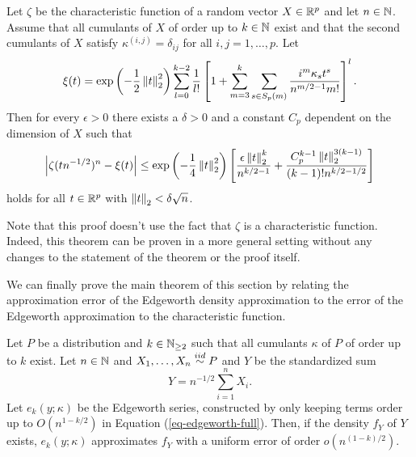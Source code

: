 \begin{theorem} \label{thm-edge-inv-tech}
    Let $\zeta$ be the characteristic function of a random vector $X \in {\mathbb{R}^p}$ and let $n \in \mathbb{N}$. Assume that all cumulants of $X$ of order up to $k \in \mathbb{N}$ exist and that the second cumulants of $X$ satisfy $\kappa^{(i, j)} = \delta_{ij}$ for all $i, j = 1, \ldots, p$. Let
    \begin{equation} \label{eq-edgeworth-fourier}
        \xi(t) = \exp\left(-\frac{1}{2}\left\lVert t\right\rVert_2^2\right)\sum_{l=0}^{k-2} \frac{1}{l!} \left[ 1 + \sum_{m=3}^k \sum_{s \in S_p(m)} \frac{i^m\kappa_s t^s}{n^{m/2-1}m!} \right]^l.
    \end{equation}
    Then for every $\epsilon > 0$ there exists a $\delta > 0$ and a constant $C_p$ dependent on the dimension of $X$ such that 
    \begin{equation}\label{eq-edge-bound}
        \left|\zeta(t n^{-1/2})^n - \xi(t)\right| \leq \exp\left(-\frac{1}{4}\left\lVert t\right\rVert_2^2\right)\left[ \frac{\epsilon\left\lVert t\right\rVert_2^k}{n^{k/2-1}} + \frac{C_p^{k-1}\left\lVert t\right\rVert_2^{3(k-1)}}{(k-1)!n^{k/2-1/2}} \right]
    \end{equation}
    holds for all $t \in {\mathbb{R}^p}$ with $\left\lVert t\right\rVert_2 < \delta\sqrt{n}$.
\end{theorem}


Note that this proof doesn't use the fact that $\zeta$ is a characteristic function. Indeed, this theorem can be proven in a more general setting without any changes to the statement of the theorem or the proof itself.

We can finally prove the main theorem of this section by relating the approximation error of the Edgeworth density approximation to the error of the Edgeworth approximation to the characteristic function.

\begin{theorem} \label{thm-edgeworth}
    Let $P$ be a distribution and $k \in \mathbb{N}_{\geq 2}$ such that all cumulants $\kappa$ of $P$ of order up to $k$ exist. Let $n \in \mathbb{N}$ and $X_1, \ldots, X_n \stackrel{iid}{\sim} P$ and $Y$ be the standardized sum
    \begin{equation*}
        Y = n^{-1/2}\sum_{i=1}^n X_i.
    \end{equation*}
    Let $e_k(y; \kappa)$ be the Edgeworth series, constructed by only keeping terms order up to $O(n^{1-k/2})$ in Equation (\ref{eq-edgeworth-full}). Then, if the density $f_Y$ of $Y$ exists, $e_k(y; \kappa)$ approximates $f_Y$ with a uniform error of order $o(n^{(1 - k)/2})$.
\end{theorem}
